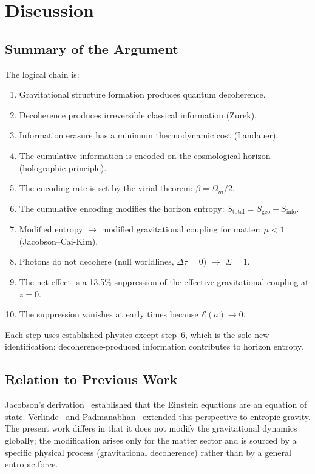 \documentclass[11pt]{article}
\begin{document}
\section{Discussion}
\label{sec:discussion}

\subsection{Summary of the Argument}

The logical chain is:
\begin{enumerate}
\item Gravitational structure formation produces quantum decoherence.
\item Decoherence produces irreversible classical information (Zurek).
\item Information erasure has a minimum thermodynamic cost (Landauer).
\item The cumulative information is encoded on the cosmological horizon
  (holographic principle).
\item The encoding rate is set by the virial theorem: $\beta = \Omega_m/2$.
\item The cumulative encoding modifies the horizon entropy:
  $S_\mathrm{total} = S_\mathrm{geo} + S_\mathrm{info}$.
\item Modified entropy $\to$ modified gravitational coupling for matter:
  $\mu < 1$ (Jacobson--Cai-Kim).
\item Photons do not decohere (null worldlines, $\Delta\tau = 0$)
  $\to$ $\Sigma = 1$.
\item The net effect is a 13.5\% suppression of the effective gravitational
  coupling at $z = 0$.
\item The suppression vanishes at early times because $\mathcal{E}(a) \to 0$.
\end{enumerate}

Each step uses established physics except step~6, which is the sole new
identification: decoherence-produced information contributes to horizon entropy.

\subsection{Relation to Previous Work}

Jacobson's derivation~\citep{Jacobson1995} established that the Einstein
equations are an equation of state.  Verlinde~\citep{Verlinde2011} and
Padmanabhan~\citep{Padmanabhan2010} extended this perspective to entropic
gravity.  The present work differs in that it does not modify the gravitational
dynamics globally; the modification arises only for the matter sector and is
sourced by a specific physical process (gravitational decoherence) rather than
by a general entropic force.
\end{document}
